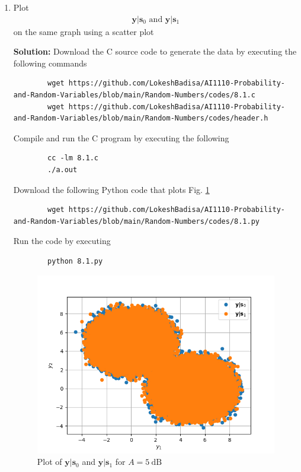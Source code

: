 \documentclass[journal,12pt,twocolumn]{IEEEtran}
\newcommand{\solution}{\noindent \textbf{Solution: }}
\providecommand{\mbf}{\mathbf}
\let\vec\mathbf
\numberwithin{equation}{section}
\renewcommand\thesection{\arabic{section}}
\begin{document}
	\begin{enumerate}[label=\thesection.\arabic*,ref=\thesection.\theenumi]
	\item Plot 
	\begin{align}
		\vec{y}|\vec{s}_0 \text{ and } \vec{y}|\vec{s}_1
	\end{align}
	on the same graph using a scatter plot
	
	\solution Download the C source code to generate the data by executing the following commands
	\begin{lstlisting}
		wget https://github.com/LokeshBadisa/AI1110-Probability-and-Random-Variables/blob/main/Random-Numbers/codes/8.1.c
		wget https://github.com/LokeshBadisa/AI1110-Probability-and-Random-Variables/blob/main/Random-Numbers/codes/header.h
	\end{lstlisting}
	Compile and run the C program by executing the following
	\begin{lstlisting}
		cc -lm 8.1.c
		./a.out
	\end{lstlisting}
	
	Download the following Python code that plots Fig. \ref{fig-8.1} 
	\begin{lstlisting}
		wget https://github.com/LokeshBadisa/AI1110-Probability-and-Random-Variables/blob/main/Random-Numbers/codes/8.1.py
	\end{lstlisting}
	Run the code by executing
	\begin{lstlisting}
		python 8.1.py
	\end{lstlisting}
	
	\begin{figure}
		\centering
		\includegraphics[width=\columnwidth]{./figs/8.1.png}
		\caption{Plot of $\mbf{y}|\mbf{s}_0$ and $\mbf{y}|\mbf{s}_1$ for $A = 5~\mathrm{dB}$}
		\label{fig-8.1}
	\end{figure}
	

\end{enumerate}
\end{document}
